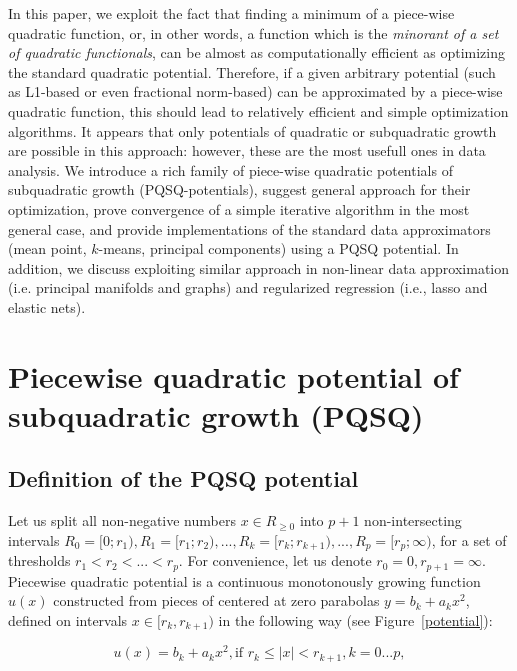 \documentclass[preprint,12pt]{elsarticle}
\begin{document}
In this paper, we exploit the fact that finding a minimum of a piece-wise quadratic function, or, in other words, a function which is the {\it minorant of a set of quadratic functionals}, can be almost as computationally efficient as optimizing the standard quadratic potential. Therefore, if a given arbitrary potential (such as L1-based or even fractional norm-based) can be approximated by a piece-wise quadratic function, this should lead to relatively efficient and simple optimization algorithms. It appears that only potentials of quadratic or subquadratic growth are possible in this approach: however, these are the most usefull ones in data analysis. We introduce a rich family of piece-wise quadratic potentials of subquadratic growth (PQSQ-potentials), suggest general approach for their optimization, prove convergence of a simple iterative algorithm in the most general case, and provide implementations of the standard data approximators (mean point, $k$-means, principal components) using a PQSQ potential. In addition, we discuss exploiting similar approach in non-linear data approximation (i.e. principal manifolds and graphs) and regularized regression (i.e., lasso and elastic nets).


\section{Piecewise quadratic potential of subquadratic growth (PQSQ)}
\label{S:2}

\subsection{Definition of the PQSQ potential}

Let us split all non-negative numbers $x\in R_{\geq 0}$ into $p+1$ non-intersecting intervals $R_0=[0;r_1), R_1=[r_1;r_2), ... , R_k=[r_k;r_{k+1}), ..., R_p=[r_p;\infty)$,  for a set of thresholds $r_1<r_2<...<r_p$. For convenience, let us denote $r_0=0, r_{p+1} = \infty$. Piecewise quadratic potential is a continuous monotonously growing function $u(x)$ constructed from pieces of centered at zero parabolas $y=b_k+a_kx^2$, defined on intervals $x\in[r_k,r_{k+1})$ in the following way (see Figure~\ref{potential}):

\begin{equation}\label{PQSQ_f}
u(x)=
b_k+a_kx^2, \mbox{if } r_k \leq |x|<r_{k+1}, k=0...p,
\end{equation}
\end{document}
